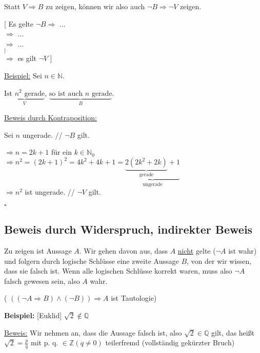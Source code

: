 \documentclass[a4paper, 12pt, twoside] {article}
\begin{document}
Statt $V \Rightarrow B$ zu zeigen, können wir also auch $\neg B \Rightarrow \neg V$ zeigen.


[ Es gelte $\neg B \Rightarrow$ ... \\
\text{\qquad\qquad\qquad} $\Rightarrow$ ... \\
\text{\qquad\qquad\qquad} $\Rightarrow$ ... \\
\text{\qquad\qquad\qquad} \space $\vdots$ \\
\text{\qquad\qquad\qquad} $\Rightarrow$ es gilt $\neg V$ ]

\hfill

\underline{Beispiel:} Sei $n \in \mathbb{N}$.

$\underbrace{\text{Ist $n^2$ gerade}}_{V}$, $\underbrace{\text{so ist auch $n$ gerade}}_{B}$.

\hfill

\underline{Beweis durch Kontraposition:}

Sei $n$ ungerade. \hfill // $\neg B$ gilt.

$\Rightarrow n = 2k + 1$ für ein $k \in \mathbb{N}_0$ \\
$\Rightarrow n^2 = (2k+1)^2 = 4k^2+4k+1 = \underbrace{\underbrace{2(2k^2+2k)}_{\text{gerade}}+1}_{\text{ungerade}}$ \\
$\Rightarrow n^2$ ist ungerade. \hfill // $\neg V$ gilt.

\hfill $\square$

\subsection{Beweis durch Widerspruch, indirekter Beweis}

Zu zeigen ist Aussage $A$. Wir gehen davon aus, dass $A$ \underline{nicht} gelte ($\neg A$ ist wahr) und folgern durch logische Schlüsse eine zweite Aussage $B$, von der wir wissen, dass sie falsch ist. Wenn alle logischen Schlüsse korrekt waren, muss also $\neg A$ falsch gewesen sein, also $A$ wahr.

( $((\neg A \Rightarrow B) \land (\neg B)) \Rightarrow A$ ist Tautologie)


\textbf{Beispiel:} [Euklid] $\sqrt{2} \notin \mathbb{Q}$

\underline{Beweis:} Wir nehmen an, dass die Aussage falsch ist, also $\sqrt{2} \in \mathbb{Q}$ gilt,
das heißt $\sqrt{2} = \frac{p}{q}$ mit p. q. $\in \mathbb{Z} (q \neq 0)$ teilerfremd (vollständig gekürzter Bruch)
\end{document}
